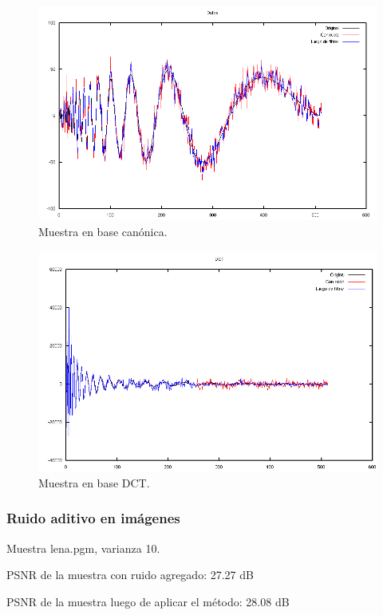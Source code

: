 \documentclass[a4paper,10pt,twoside]{article}
\begin{document}
\begin{figure}[H]
  \centering
  \includegraphics[width=15cm]{graficos/dopp_aditivo_umbralizar_muestra.png}
  \caption{Muestra en base canónica.}
\end{figure}

\begin{figure}[H]
  \centering
  \includegraphics[width=15cm]{graficos/dopp_aditivo_umbralizar_dct.png} 
  \caption{Muestra en base DCT.}
\end{figure}


\subsubsection{Ruido aditivo en imágenes}

Muestra lena.pgm, varianza 10.

PSNR de la muestra con ruido agregado: 27.27 dB

PSNR de la muestra luego de aplicar el método: 28.08 dB
\end{document}
